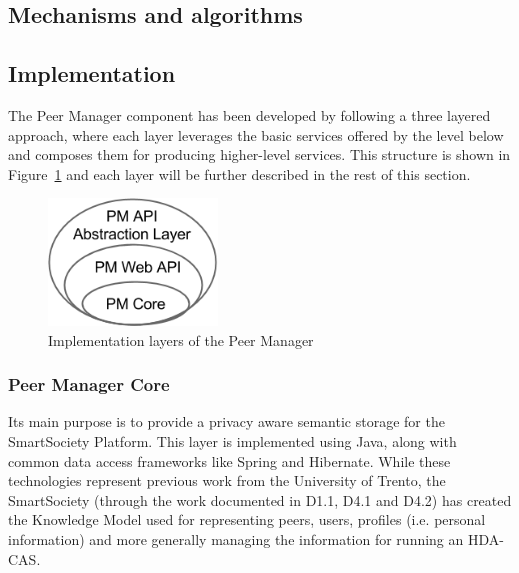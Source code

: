 
\subsection{Mechanisms and algorithms}



\subsection{Implementation}

The Peer Manager component has been developed by following a three layered approach, where each layer leverages the basic services offered by the level below and composes them for producing higher-level services. This structure is shown in Figure~\ref{fig:pm-component-layers} and each layer will be further described in the rest of this section. 

\begin{figure}[htbp]
\centering
\includegraphics[width=0.4\textwidth]{figures/pm-component-layers.png}
\caption{Implementation layers of the Peer Manager}
\label{fig:pm-component-layers}
\end{figure}


\subsubsection{Peer Manager Core}
Its main purpose is to provide a privacy aware semantic storage for the SmartSociety Platform. This layer is implemented using Java, along with common data access frameworks like Spring and Hibernate.
While these technologies represent previous work from the University of Trento, the SmartSociety (through the work documented in D1.1, D4.1 and D4.2) has created the Knowledge Model used for representing peers, users, profiles (i.e. personal information) and more generally managing the information for running an HDA-CAS.

